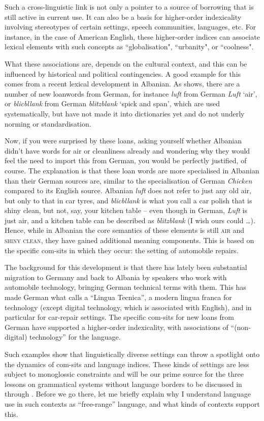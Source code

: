 Such a cross-linguistic link is not only a pointer to a source of borrowing that is still active in current use. It can also be a basis for higher-order indexicality involving stereotypes of certain settings, speech communities, languages, etc. For instance, in the case of American English, these higher-order indices can associate lexical elements with such concepts as “globalisation", “urbanity", or “coolness".

What these associations are, depends on the cultural context, and this can be influenced by historical and political contingencies. A good example for this comes from a recent lexical development in Albanian. As \citet{Jusufi2022} shows, there are a number of new loanwords from German, for instance \textit{luft} from German \textit{Luft} ‘air’, or \textit{blicbllank} from German \textit{blitzblank} ‘spick and span’, which are used systematically, but have not made it into dictionaries yet and do not underly norming or standardisation.

Now, if you were surprised by these loans, asking yourself whether Albanian didn’t have words for air or cleanliness already and wondering why they would feel the need to import this from German, you would be perfectly justified, of course. The explanation is that these loan words are more specialised in Albanian than their German sources are, similar to the specialisation of German \textit{Chicken} compared to its English source. Albanian \textit{luft} does not refer to just any old air, but only to that in car tyres, and \textit{blicbllank} is what you call a car polish that is shiny clean, but not, say, your kitchen table – even though in German, \textit{Luft} is just air, and a kitchen table can be described as \textit{blitzblank} (I wish ours could …). Hence, while in Albanian the core semantics of these elements is still \textsc{air} and \textsc{shiny} \textsc{clean}, they have gained additional meaning components. This is based on the specific com-sits in which they occur: the setting of automobile repairs.

The background for this development is that there has lately been substantial migration to Germany and back to Albania by speakers who work with automobile technology, bringing German technical terms with them. This has made German what \citet{Jusufi2022} calls a “Lingua Tecnica”, a modern lingua franca for technology (except digital technology, which is associated with English), and in particular for car-repair settings. The specific com-sits for new loans from German have supported a higher-order indexicality, with associations of “(non-digital) technology” for the language.

\largerpage
Such examples show that linguistically diverse settings can throw  a spotlight onto the dynamics of com-sits and language indices. These  kinds of settings are less subject to monoglossic constraints and will be our prime source for the three lessons on grammatical systems without language borders to be discussed in  through . Before we go there, let me briefly explain why I understand language use in such contexts as “free-range” language, and what kinds of contexts support this.
